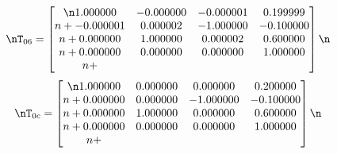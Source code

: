 \begin{equation*}\nT_{06} = \begin{bmatrix}\n1.000000 & -0.000000 & -0.000001 & 0.199999 \\n+-0.000001 & 0.000002 & -1.000000 & -0.100000 \\n+0.000000 & 1.000000 & 0.000002 & 0.600000 \\n+0.000000 & 0.000000 & 0.000000 & 1.000000 \\n+\end{bmatrix}\n\end{equation*}\n\n\begin{equation*}\nT_{0c} = \begin{bmatrix}\n1.000000 & 0.000000 & 0.000000 & 0.200000 \\n+0.000000 & 0.000000 & -1.000000 & -0.100000 \\n+0.000000 & 1.000000 & 0.000000 & 0.600000 \\n+0.000000 & 0.000000 & 0.000000 & 1.000000 \\n+\end{bmatrix}\n\end{equation*}\n
